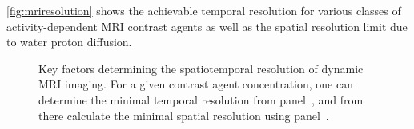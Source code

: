 \autoref{fig:mriresolution} shows the achievable temporal resolution for various classes of activity-dependent MRI contrast agents as well as the spatial resolution limit due to water proton diffusion.

\begin{figure}[htbp]
\caption{Key factors determining the spatiotemporal resolution of dynamic MRI imaging. For a given contrast agent concentration, one can determine the minimal temporal resolution from panel~\protect{}, and from there calculate the minimal spatial resolution using panel~\protect{}.}
\label{fig:mriresolution}
\centering
{}
\hspace{1mm}
\end{figure}

